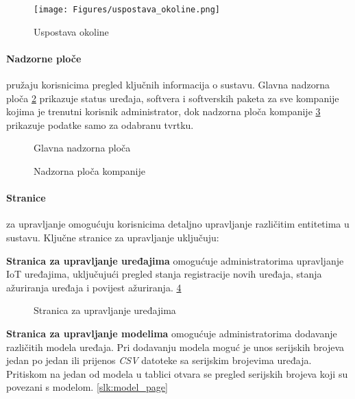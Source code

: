 \documentclass[zavrsnirad]{fer}
\begin{document}
	\begin{figure}[htb]
		\centering
		\texttt{[image: Figures/uspostava\_okoline.png]} 
		\caption{Uspostava okoline}
		\label{slk:upostava_okoline}
	\end{figure}
	
	
	\paragraph{Nadzorne ploče} pružaju korisnicima pregled ključnih informacija o sustavu. Glavna nadzorna ploča \ref{slk:main_dashboard} prikazuje status uređaja, softvera i softverskih paketa za sve kompanije kojima je trenutni korisnik administrator, dok nadzorna ploča kompanije \ref{slk:company_dashboard} prikazuje podatke samo za odabranu tvrtku. 
	
	\begin{figure}[H]
		\centering
		\caption{Glavna nadzorna ploča}
		\label{slk:main_dashboard}
	\end{figure}
	\begin{figure}[htb]
		\centering
		\caption{Nadzorna ploča kompanije}
		\label{slk:company_dashboard}
	\end{figure}
	
	\paragraph{Stranice} za upravljanje omogućuju korisnicima detaljno upravljanje različitim entitetima u sustavu. Ključne stranice za upravljanje uključuju:
	
	\textbf{Stranica za upravljanje uređajima} omogućuje administratorima upravljanje IoT uređajima, uključujući pregled stanja registracije novih uređaja, stanja ažuriranja uređaja i povijest ažuriranja. \ref{slk:device_page}
	
	\begin{figure}[H]
		\centering
		\caption{Stranica za upravljanje uređajima}
		\label{slk:device_page}
	\end{figure}
	
	\textbf{Stranica za upravljanje modelima} omogućuje administratorima dodavanje različitih modela uređaja. Pri dodavanju modela moguć je unos serijskih brojeva jedan po jedan ili prijenos \textit{CSV} datoteke sa serijskim brojevima uređaja. Pritiskom na jedan od modela u tablici otvara se pregled serijskih brojeva koji su povezani s modelom. \ref{slk:model_page}
	
\end{document}
